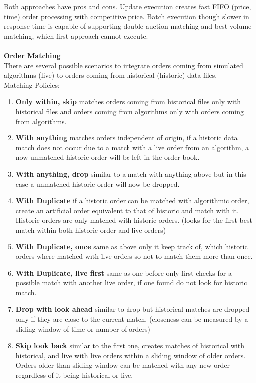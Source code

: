 \documentclass{article}
\begin{document}
Both approaches have pros and cons. Update execution creates fast FIFO (price, time) order processing with competitive price. Batch execution though slower in response time is capable of supporting double auction matching and best volume matching, which first approach cannot execute. 
\\
\\
{\bf Order Matching} 
\\
There are several possible scenarios to integrate orders coming from simulated algorithms (live) to orders coming from historical (historic) data files.
\\
\noindent Matching Policies:
\begin{enumerate}
    \item {\bf Only within, skip} matches orders coming from historical files only with historical files and orders coming from algorithms only with orders coming from algorithms.
    \item{\bf With anything} matches orders independent of origin, if a historic data match does not occur due to a match with a live order from an algorithm, a now unmatched historic order will be left in the order book. 
    \item{\bf With anything, drop} similar to a match with anything above but in this case a unmatched historic order will now be dropped. 
    \item{\bf With Duplicate} if a historic order can be matched with algorithmic order, create an artificial order equivalent to that of historic and match with it. Historic orders are only matched with historic orders. (looks for the first best match within both historic order and live orders)
    \item{\bf With Duplicate, once} same as above only it keep track of, which historic orders where matched with live orders so not to match them more than once. 
    \item{\bf With Duplicate, live first} same as one before only first checks for a possible match with another live order, if one found do not look for historic match. 
    \item{\bf Drop with look ahead} similar to drop but historical matches are dropped only if they are close to the current match. (closeness can be measured by a sliding window of time or number of orders)
    \item{\bf Skip look back} similar to the first one, creates matches of historical with historical, and live with live orders within a sliding window of older orders. Orders older than sliding window can be matched with any new order regardless of it being historical or live.
\end{enumerate}
\end{document}
